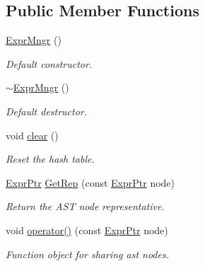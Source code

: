 \subsection*{Public Member Functions}
\begin{DoxyCompactItemize}
\item 
\mbox{\label{classilang_1_1_expr_mngr_a26b8d898425956cc09c989a7dd166799}} 
\mbox{\hyperlink{classilang_1_1_expr_mngr_a26b8d898425956cc09c989a7dd166799}{Expr\+Mngr}} ()
\begin{DoxyCompactList}\small\item\em Default constructor. \end{DoxyCompactList}\item 
\mbox{\label{classilang_1_1_expr_mngr_af1a5b18c4f788503bf92496114b810b4}} 
\mbox{\hyperlink{classilang_1_1_expr_mngr_af1a5b18c4f788503bf92496114b810b4}{$\sim$\+Expr\+Mngr}} ()
\begin{DoxyCompactList}\small\item\em Default destructor. \end{DoxyCompactList}\item 
\mbox{\label{classilang_1_1_expr_mngr_a27870f9467647a3f66c1eca4f78cf162}} 
void \mbox{\hyperlink{classilang_1_1_expr_mngr_a27870f9467647a3f66c1eca4f78cf162}{clear}} ()
\begin{DoxyCompactList}\small\item\em Reset the hash table. \end{DoxyCompactList}\item 
\mbox{\label{classilang_1_1_expr_mngr_ae4854bc79239f1594a9c1ab2d2333147}} 
\mbox{\hyperlink{namespaceilang_a7c4196c72e53ea4df4b7861af7bc3bce}{Expr\+Ptr}} \mbox{\hyperlink{classilang_1_1_expr_mngr_ae4854bc79239f1594a9c1ab2d2333147}{Get\+Rep}} (const \mbox{\hyperlink{namespaceilang_a7c4196c72e53ea4df4b7861af7bc3bce}{Expr\+Ptr}} node)
\begin{DoxyCompactList}\small\item\em Return the A\+ST node representative. \end{DoxyCompactList}\item 
\mbox{\label{classilang_1_1_expr_mngr_a9299c83d6d3d68ce4de08bdd12ee4cf5}} 
void \mbox{\hyperlink{classilang_1_1_expr_mngr_a9299c83d6d3d68ce4de08bdd12ee4cf5}{operator()}} (const \mbox{\hyperlink{namespaceilang_a7c4196c72e53ea4df4b7861af7bc3bce}{Expr\+Ptr}} node)
\begin{DoxyCompactList}\small\item\em Function object for sharing ast nodes. \end{DoxyCompactList}\end{DoxyCompactItemize}
